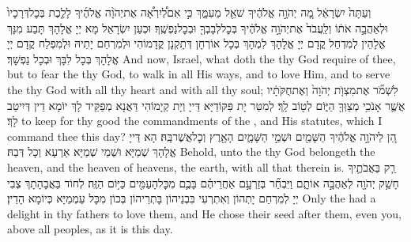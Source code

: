 {וְעַתָּה֙ יִשְׂרָאֵ֔ל מָ֚ה יְהֹוָ֣ה אֱלֹהֶ֔יךָ שֹׁאֵ֖ל מֵעִמָּ֑ךְ כִּ֣י אִם\maqqaf לְ֠יִרְאָ֠ה אֶת\maqqaf יְהֹוָ֨ה אֱלֹהֶ֜יךָ לָלֶ֤כֶת בְּכׇל\maqqaf דְּרָכָיו֙ וּלְאַהֲבָ֣ה אֹת֔וֹ וְלַֽעֲבֹד֙ אֶת\maqqaf יְהֹוָ֣ה אֱלֹהֶ֔יךָ בְּכׇל\maqqaf לְבָבְךָ֖ וּבְכׇל\maqqaf נַפְשֶֽׁךָ׃}
{וּכְעַן יִשְׂרָאֵל מָא יְיָ אֱלָהָךְ תָּבַע מִנָּךְ אֱלָהֵין לְמִדְחַל קֳדָם יְיָ אֱלָהָךְ לִמְהָךְ בְּכָל אוֹרְחָן דְּתָקְנָן קֳדָמוֹהִי וּלְמִרְחַם יָתֵיהּ וּלְמִפְלַח קֳדָם יְיָ אֱלָהָךְ בְּכָל לִבָּךְ וּבְכָל נַפְשָׁךְ׃}
{And now, Israel, what doth the \lord\space thy God require of thee, but to fear the \lord\space thy God, to walk in all His ways, and to love Him, and to serve the \lord\space thy God with all thy heart and with all thy soul;}{}
{לִשְׁמֹ֞ר אֶת\maqqaf מִצְוֺ֤ת יְהֹוָה֙ וְאֶת\maqqaf חֻקֹּתָ֔יו אֲשֶׁ֛ר אָנֹכִ֥י מְצַוְּךָ֖ הַיּ֑וֹם לְט֖וֹב לָֽךְ׃}
{לְמִטַּר יָת פִּקּוֹדַיָּא דַּייָ וְיָת קְיָמוֹהִי דַּאֲנָא מְפַקֵּיד לָךְ יוֹמָא דֵין דְּיִיטַב לָךְ׃}
{to keep for thy good the commandments of the \lord, and His statutes, which I command thee this day?}{}
{הֵ֚ן לַיהֹוָ֣ה אֱלֹהֶ֔יךָ הַשָּׁמַ֖יִם וּשְׁמֵ֣י הַשָּׁמָ֑יִם הָאָ֖רֶץ וְכׇל\maqqaf אֲשֶׁר\maqqaf בָּֽהּ׃}
{הָא דַּייָ אֱלָהָךְ שְׁמַיָּא וּשְׁמֵי שְׁמַיָּא אַרְעָא וְכָל דְּבַהּ׃}
{Behold, unto the \lord\space thy God belongeth the heaven, and the heaven of heavens, the earth, with all that therein is.}{}
{רַ֧ק בַּאֲבֹתֶ֛יךָ חָשַׁ֥ק יְהֹוָ֖ה לְאַהֲבָ֣ה אוֹתָ֑ם וַיִּבְחַ֞ר בְּזַרְעָ֣ם אַחֲרֵיהֶ֗ם בָּכֶ֛ם מִכׇּל\maqqaf הָעַמִּ֖ים כַּיּ֥וֹם הַזֶּֽה׃}
{לְחוֹד בַּאֲבָהָתָךְ צְבִי יְיָ לְמִרְחַם יָתְהוֹן וְאִתְרְעִי בִּבְנֵיהוֹן בָּתְרֵיהוֹן בְּכוֹן מִכָּל עַמְמַיָּא כְּיוֹמָא הָדֵין׃}
{Only the \lord\space had a delight in thy fathers to love them, and He chose their seed after them, even you, above all peoples, as it is this day.}{}
